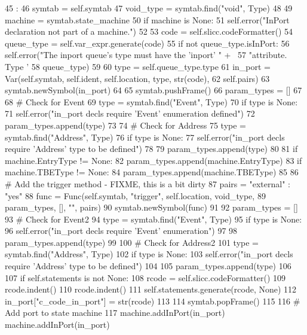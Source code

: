 \begin{DoxyCode}
45                       :
46         symtab = self.symtab
47         void_type = symtab.find("void", Type)
48 
49         machine = symtab.state_machine
50         if machine is None:
51             self.error("InPort declaration not part of a machine.")
52 
53         code = self.slicc.codeFormatter()
54         queue_type = self.var_expr.generate(code)
55         if not queue_type.isInPort:
56             self.error("The inport queue's type must have the 'inport' " + \
57                        "attribute.  Type '%
58                        queue_type)
59 
60         type = self.queue_type.type
61         in_port = Var(self.symtab, self.ident, self.location, type, str(code),
62                       self.pairs)
63         symtab.newSymbol(in_port)
64 
65         symtab.pushFrame()
66         param_types = []
67 
68         # Check for Event
69         type = symtab.find("Event", Type)
70         if type is None:
71             self.error("in_port decls require 'Event' enumeration defined")
72         param_types.append(type)
73 
74         # Check for Address
75         type = symtab.find("Address", Type)
76         if type is None:
77             self.error("in_port decls require 'Address' type to be defined")
78 
79         param_types.append(type)
80 
81         if machine.EntryType != None:
82             param_types.append(machine.EntryType)
83         if machine.TBEType != None:
84             param_types.append(machine.TBEType)
85 
86         # Add the trigger method - FIXME, this is a bit dirty
87         pairs = { "external" : "yes" }
88         func = Func(self.symtab, "trigger", self.location, void_type,
89                     param_types, [], "", pairs)
90         symtab.newSymbol(func)
91 
92         param_types = []
93         # Check for Event2
94         type = symtab.find("Event", Type)
95         if type is None:
96             self.error("in_port decls require 'Event' enumeration")
97 
98         param_types.append(type)
99 
100         # Check for Address2
101         type = symtab.find("Address", Type)
102         if type is None:
103             self.error("in_port decls require 'Address' type to be defined")
104 
105         param_types.append(type)
106 
107         if self.statements is not None:
108             rcode = self.slicc.codeFormatter()
109             rcode.indent()
110             rcode.indent()
111             self.statements.generate(rcode, None)
112             in_port["c_code_in_port"] = str(rcode)
113 
114         symtab.popFrame()
115 
116         # Add port to state machine
117         machine.addInPort(in_port)
        machine.addInPort(in_port)
\end{DoxyCode}



